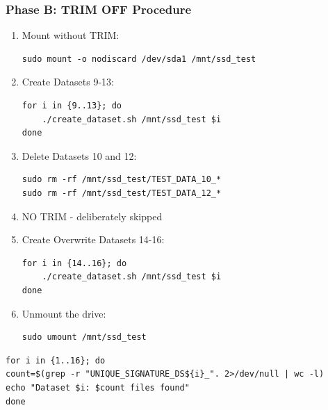 \subsubsection*{Phase B: TRIM OFF Procedure}
\begin{enumerate}

\item{Mount without TRIM:}

\begin{verbatim}
sudo mount -o nodiscard /dev/sda1 /mnt/ssd_test
\end{verbatim}

\item{Create Datasets 9-13:}

\begin{verbatim}
for i in {9..13}; do
    ./create_dataset.sh /mnt/ssd_test $i
done
\end{verbatim}

\item{Delete Datasets 10 and 12:}

\begin{verbatim}
sudo rm -rf /mnt/ssd_test/TEST_DATA_10_*
sudo rm -rf /mnt/ssd_test/TEST_DATA_12_*
\end{verbatim}

\item{NO TRIM - deliberately skipped}

\item{Create Overwrite Datasets 14-16:}

\begin{verbatim}
for i in {14..16}; do
    ./create_dataset.sh /mnt/ssd_test $i
done
\end{verbatim}

\item{Unmount the drive:}

\begin{verbatim}
sudo umount /mnt/ssd_test
\end{verbatim}

\end{enumerate}

\begin{verbatim}
for i in {1..16}; do
count=$(grep -r "UNIQUE_SIGNATURE_DS${i}_". 2>/dev/null | wc -l)
echo "Dataset $i: $count files found"
done
\end{verbatim}

